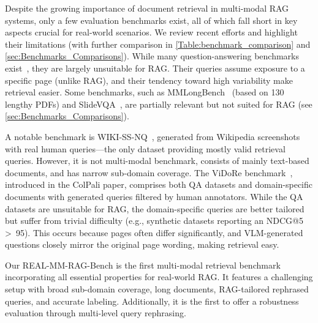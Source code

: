 Despite the growing importance of document retrieval in multi-modal RAG systems, only a few evaluation benchmarks exist, all of which fall short in key aspects crucial for real-world scenarios. We review recent efforts and highlight their limitations (with further comparison in \cref{Table:benchmark_comparison} and \cref{sec:Benchmarks_Comparisons}).
While many question-answering benchmarks exist~\citep{mathew2021docvqa,zhu2022towards,masry2022chartqa,islam2023financebench,ding2024mvqa}, they are largely unsuitable for RAG. Their queries assume exposure to a specific page (unlike RAG), and their tendency toward high variability make retrieval easier. Some benchmarks, such as MMLongBench~\citep{ma2024mmlongbench} (based on 130 lengthy PDFs) and SlideVQA~\citep{tanaka2023slidevqa}, are partially relevant but not suited for RAG (see \cref{sec:Benchmarks_Comparisons}).

\vspace{0.1cm}
\noindent
A notable benchmark is WIKI-SS-NQ~\citep{ma2024unifying}, generated from Wikipedia screenshots with real human queries—the only dataset providing mostly valid retrieval queries. However, it is not multi-modal benchmark, consists of mainly text-based documents, and has narrow sub-domain coverage.
The ViDoRe benchmark~\citep{faysse2024colpali}, introduced in the ColPali paper, comprises both QA datasets and domain-specific documents with generated queries filtered by human annotators. While the QA datasets are unsuitable for RAG, the domain-specific queries are better tailored but suffer from trivial difficulty (e.g., synthetic datasets reporting an NDCG@5 >~95). This occurs because pages often differ significantly, and VLM-generated questions closely mirror the original page wording, making retrieval easy.

\vspace{0.1cm}
\noindent
Our REAL-MM-RAG-Bench is the first multi-modal retrieval benchmark incorporating all essential properties for real-world RAG. It features a challenging setup with broad sub-domain coverage, long documents, RAG-tailored rephrased queries, and accurate labeling. Additionally, it is the first to offer a robustness evaluation through multi-level query rephrasing.